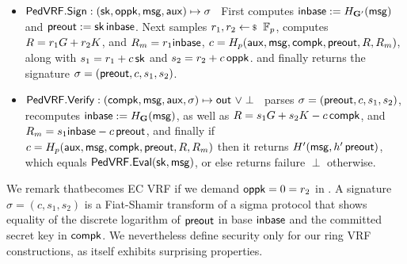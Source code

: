 \begin{itemize}
\item ${\mathsf{PedVRF}}.{\mathsf{Sign}} : (\mathsf{sk},\mathsf{oppk},\mathsf{msg},\mathsf{aux}) \mapsto \sigma$ \,
    First computes ${\mathsf{inbase}} := H_{{\mathbf{G}}'}(\mathsf{msg})$ and ${\mathsf{preout}} := \mathsf{sk} \, {\mathsf{inbase}}$.
    Next samples $r_1,r_2 \leftsample \F_p$,
    computes $R = r_1 G + r_2 K$, and $R_m = r_1 {\mathsf{inbase}}$,
     $c = H_p(\mathsf{aux},\mathsf{msg},\mathsf{compk},{\mathsf{preout}},R,R_m)$,
     along with $s_1 = r_1 + c \, \mathsf{sk}$ and $s_2 = r_2 + c \, \mathsf{oppk}$.
    and finally returns the signature $\sigma = ({\mathsf{preout}},c,s_1,s_2)$.
\item ${\mathsf{PedVRF}}.{\mathsf{Verify}} : (\mathsf{compk},\mathsf{msg},\mathsf{aux},\sigma) \mapsto {\ensuremath{\mathsf{out}}} \,\, \lor \perp$ \,
    parses $\sigma = ({\mathsf{preout}},c,s_1,s_2)$, 
    recomputes ${\mathsf{inbase}} := H_{{\mathbf{G}}}(\mathsf{msg})$, as well as
    $R = s_1 G + s_2 K - c \, \mathsf{compk}$, and
    $R_m = s_1 {\mathsf{inbase}} - c \, {\mathsf{preout}}$, and finally
    if $c = H_p(\mathsf{aux},\mathsf{msg},\mathsf{compk},{\mathsf{preout}},R,R_m)$ then it returns $H'(\mathsf{msg}, h' \, {\mathsf{preout}})$, which equals ${\mathsf{PedVRF}}.{\mathsf{Eval}}(\mathsf{sk},\mathsf{msg})$,
         or else returns failure $\perp$ otherwise.
\end{itemize}

\noindent We remark that\PedVRF becomes EC VRF if we demand $\mathsf{oppk} = 0 = r_2$ in \Sign.
A signature $\sigma = (c,s_1, s_2)$ is a Fiat-Shamir transform of a
sigma protocol that shows equality of the discrete logarithm of ${\mathsf{preout}}$
in base ${\mathsf{inbase}}$ and the committed secret key in $\mathsf{compk}$.
We nevertheless define security only for our ring VRF constructions,
 as \PedVRF itself exhibits surprising properties.

